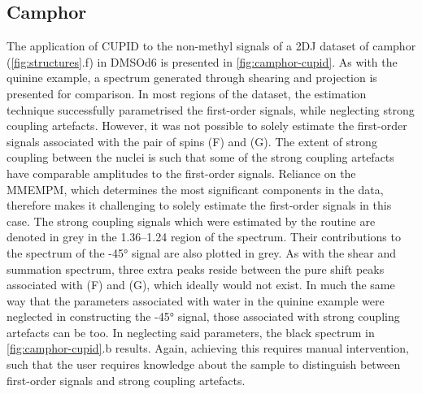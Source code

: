 \subsection{Camphor}
The application of \ac{CUPID} to the non-methyl signals of a \ac{2DJ}
dataset of camphor (\cref{fig:structures}.f) in \acs{DMSOd6} is presented
in \cref{fig:camphor-cupid}. As with the quinine example, a spectrum
generated through shearing and projection is presented for
comparison. In most regions of the dataset, the estimation technique
successfully parametrised the first-order signals, while neglecting strong
coupling artefacts. However, it was not possible to solely estimate the
first-order signals associated with the pair of spins (F) and (G). The extent
of strong coupling between the nuclei is such that some of the strong coupling
artefacts have comparable amplitudes to the first-order signals. Reliance on
the
\ac{MMEMPM}, which determines the most significant components in
the data, therefore makes it challenging to solely estimate the first-order
signals in this case. The strong coupling signals which were estimated by the
routine are denoted in grey in the \SIrange{1.36}{1.24}{\partspermillion} region
of the spectrum. Their contributions to the spectrum of the \ang{-45} signal
are also plotted in grey. As with the shear and summation spectrum, three extra
peaks reside between the pure shift peaks associated with (F) and (G), which
ideally would not exist. In much the same way that the parameters associated
with water in the quinine example were neglected in constructing the \ang{-45}
signal, those associated with strong coupling artefacts can be too.
In neglecting said parameters, the black spectrum in \cref{fig:camphor-cupid}.b
results. Again, achieving this requires manual intervention, such that the user
requires knowledge about the sample to distinguish between first-order signals
and strong coupling artefacts.


